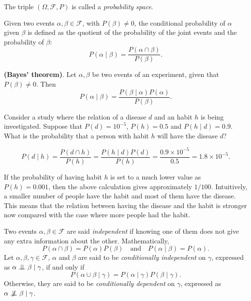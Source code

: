 The triple \((\Omega, \mathcal{F}, P)\) is called a \emph{probability space}.

\begin{definition}
  Given two events \(\alpha, \beta \in \mathcal{F}\), with \(P(\beta) \neq 0\),
  the conditional probability of \(\alpha\) given \(\beta\) is defined as the
  quotient of the probability of the joint events and the probability of
  \(\beta\):
  \[
    P(\alpha \mid \beta) = \frac{P(\alpha \cap \beta)}{P(\beta)}.
  \]
\end{definition}

\begin{theorem}
  \textbf{(Bayes' theorem)}. Let \(\alpha, \beta\) be two events of an
  experiment, given that \(P(\beta) \neq 0\). Then
  \[
  P(\alpha \mid \beta)= \frac{P(\beta \mid \alpha)P(\alpha)}{P(\beta)}.
\]
\end{theorem}

\begin{exampleth}
Consider a study where the relation of a disease \(d\) and an habit \(h\)
is being investigated. Suppose that \(P(d)=10^{-5}\), \(P(h)=0.5\) and \(P(h\mid d) = 0.9\). What is the
probability that a person with habit \(h\) will have the disease \(d\)?

\[
P(d \mid h) = \frac{P(d \cap h)}{P(h)} = \frac{P(h \mid d)P(d)}{P(h)} =
\frac{ 0.9 \times 10^{-5}}{ 0.5 } = 1.8 \times 10^{-5}.
\]

If the probability of having habit \(h\) is set to a much lower value as \(P(h) =
0.001\), then the above calculation gives approximately \(1/100\). Intuitively, a smaller number of people have the habit and most of them have the
disease. This means that the relation between having the disease and the habit
is stronger now compared with the case where more people had the habit.
\end{exampleth}

\begin{definition}
  Two events \(\alpha, \beta \in \mathcal{F}\) are said
  \emph{independent} if knowing one of them does not give any extra information
  about the other. Mathematically,
  \[
    P(\alpha \cap \beta) = P(\alpha)P(\beta) \quad \text{and} \quad P(\alpha \mid \beta) = P(\alpha).
  \]
  Let \(\alpha, \beta, \gamma \in \mathcal{F}\), \(\alpha\) and \(\beta\) are said to be
  \emph{conditionally independent} on \(\gamma\), expressed as \(\alpha \bigCI \beta \mid \gamma\),  if and only if
  \[
    P(\alpha \cup \beta \mid \gamma) = P(\alpha \mid \gamma)P(\beta \mid \gamma).
  \]
  Otherwise, they are said to be \emph{conditionally dependent} on \(\gamma\), expressed as \(\alpha \bigCD \beta \mid \gamma\).
\end{definition}

